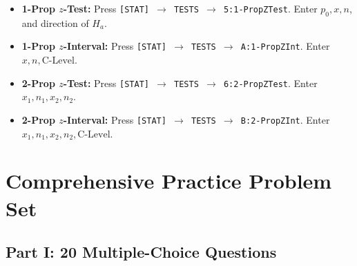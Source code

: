 \begin{calculatorbox}
\begin{itemize}[leftmargin=1.2em]
  \item \textbf{1-Prop $z$-Test:} Press \texttt{[STAT] $\rightarrow$ TESTS $\rightarrow$ 5:1-PropZTest}. Enter $p_0, x, n$, and direction of $H_a$.
  \item \textbf{1-Prop $z$-Interval:} Press \texttt{[STAT] $\rightarrow$ TESTS $\rightarrow$ A:1-PropZInt}. Enter $x, n, \text{C-Level}$.
  \item \textbf{2-Prop $z$-Test:} Press \texttt{[STAT] $\rightarrow$ TESTS $\rightarrow$ 6:2-PropZTest}. Enter $x_1, n_1, x_2, n_2$.
  \item \textbf{2-Prop $z$-Interval:} Press \texttt{[STAT] $\rightarrow$ TESTS $\rightarrow$ B:2-PropZInt}. Enter $x_1, n_1, x_2, n_2, \text{C-Level}$.
\end{itemize}
\end{calculatorbox}

\section{Comprehensive Practice Problem Set}

\subsection*{Part I: 20 Multiple-Choice Questions}


